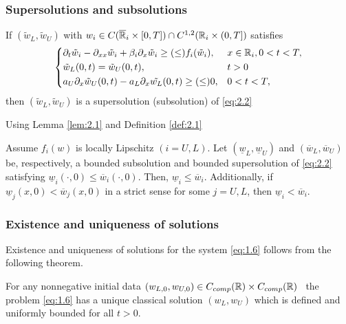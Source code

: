 \begin{frame}[allowframebreaks]
    \frametitle{Supersolutions and subsolutions}
    \begin{definition}
        If \((\tilde{w}_L, \tilde{w}_{U})\) with \(w_i \in C(\overline{\mathbb{R}}_i \times [0, T]) \cap C^{1,2}(\mathbb{R}_i \times (0, T])\) satisfies 
        \begin{equation}
            \begin{dcases}
                \partial_t \tilde{w}_i - \partial_{xx} \tilde{w}_i + \beta_i \partial_x \tilde{w}_i \geq (\leq) f_i(\tilde{w}_i), & x \in \mathbb{R}_i, 0 < t < T, \\
                \tilde{w}_L(0, t) = \tilde{w}_{U}(0, t), & t > 0 \\
                    a_{U} \partial_x \tilde{w}_{U}(0, t) - a_L \partial_x \tilde{w_L}(0, t) \geq (\leq) 0, & 0 < t < T, \\
            \end{dcases}
            \label{eq:2.2}
        \end{equation}
        then \((\tilde{w}_L, \tilde{w}_{U})\) is a supersolution (subsolution) of \ref{eq:2.2}
        \label{def:2.1}
    \end{definition}
    \framebreak
    Using Lemma \ref{lem:2.1} and Definition \ref{def:2.1}
    \begin{lemma}
        Assume \(f_i(w)\) is locally Lipschitz \((i = U, L)\). Let \((\underline{w}_L, \underline{w}_{U})\) and \((\overline{w}_L, \overline{w}_{U})\) be, respectively, a bounded subsolution and bounded supersolution of \ref{eq:2.2} satisfying \(\underline{w}_i(\cdot, 0) \leq \overline{w}_i(\cdot, 0)\). Then, \(\underline{w}_i \leq \overline{w}_i\). Additionally, if \(\underline{w}_j(x,0) < \overline{w}_j(x,0)\) in a strict sense for some \(j = U, L\), then \(\underline{w}_i < \overline{w}_i\).
        \label{lem:2.2} 
    \end{lemma}
\end{frame}


\begin{frame}
    \frametitle{Existence and uniqueness of solutions}
    Existence and uniqueness of solutions for the system \ref{eq:1.6} follows from the following theorem.
    \begin{theorem}
        For any nonnegative initial data \((w_{L,0}, w_{U,0}) \in C_{comp}(\mathbb{R}) \times C_{comp}(\mathbb{R}) \) \, the problem \eqref{eq:1.6} has a unique classical solution \((w_L, w_{U})\) which is defined and uniformly bounded for all \(t > 0\).
        \label{thm:2.4}
    \end{theorem}
\end{frame}

